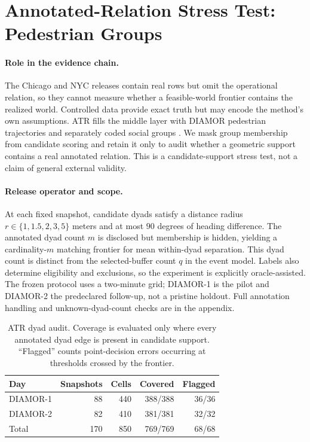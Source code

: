 \section{Annotated-Relation Stress Test: Pedestrian Groups}
\label{sec:atr-transfer}

\paragraph{Role in the evidence chain.}
The Chicago and NYC releases contain real rows but omit the operational
relation, so they cannot measure whether a feasible-world frontier contains the
realized world. Controlled data provide exact truth but may encode the method's
own assumptions. ATR fills the middle layer with DIAMOR pedestrian trajectories
and separately coded social groups \citep{atrgroupdata2015,zanlungo2014potential}.
We mask group membership from candidate scoring and retain it only to audit
whether a geometric support contains a real annotated relation. This is a
candidate-support stress test, not a claim of general external validity.

\paragraph{Release operator and scope.}
At each fixed snapshot, candidate dyads satisfy a distance radius
$r\in\{1,1.5,2,3,5\}$ meters and at most $90$ degrees of heading difference.
The annotated dyad count $m$ is disclosed but membership is hidden, yielding a
cardinality-$m$ matching frontier for mean within-dyad separation. This dyad
count is distinct from the selected-buffer count $q$ in the event model. Labels also
determine eligibility and exclusions, so the experiment is explicitly
oracle-assisted. The frozen protocol uses a two-minute grid; DIAMOR-1 is the
pilot and DIAMOR-2 the predeclared follow-up, not a pristine holdout. Full
annotation handling and unknown-dyad-count checks are in the appendix.

\begin{table}[t]
\caption{ATR dyad audit. Coverage is evaluated only where every annotated dyad
edge is present in candidate support. ``Flagged'' counts point-decision errors
occurring at thresholds crossed by the frontier.}
\label{tab:atr-truth}
\centering
\small
\setlength{\tabcolsep}{3pt}
\begin{tabular}{@{}lrrrr@{}}
\toprule
Day & Snapshots & Cells & Covered & Flagged \\
\midrule
DIAMOR-1 & 88 & 440 & 388/388 & 36/36 \\
DIAMOR-2 & 82 & 410 & 381/381 & 32/32 \\
\midrule
Total & 170 & 850 & 769/769 & 68/68 \\
\bottomrule
\end{tabular}
\end{table}

